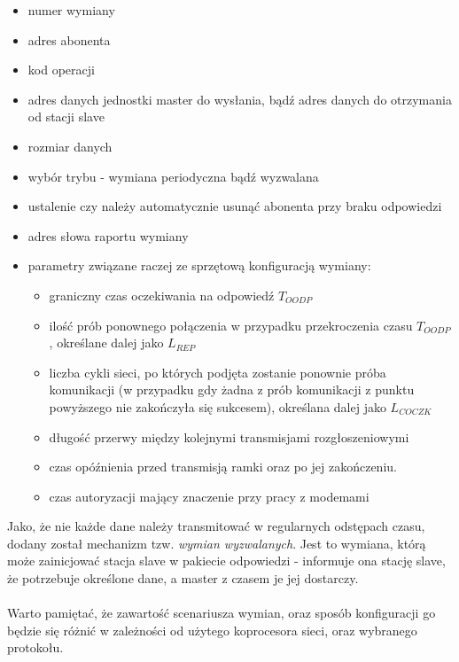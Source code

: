 	\begin{itemize}
		\item numer wymiany
		\item adres abonenta
		\item kod operacji
		\item adres danych jednostki master do wysłania, bądź adres danych do otrzymania od stacji slave
		\item rozmiar danych
		\item wybór trybu - wymiana periodyczna bądź wyzwalana
		\item ustalenie czy należy automatycznie usunąć abonenta przy braku odpowiedzi
		\item adres słowa raportu wymiany
		\item parametry związane raczej ze sprzętową konfiguracją wymiany:
		\begin{itemize}
			\item graniczny czas oczekiwania na odpowiedź $ T_{OODP} $
			\item ilość prób ponownego połączenia w przypadku przekroczenia czasu $ T_{OODP} $, określane dalej jako $ L_{REP} $
			\item liczba cykli sieci, po których podjęta zostanie ponownie próba komunikacji (w przypadku gdy żadna z prób komunikacji z punktu powyższego nie zakończyła się sukcesem), określana dalej jako $ L_{COCZK} $
			\item długość przerwy między kolejnymi transmisjami rozgłoszeniowymi
			\item czas opóźnienia przed transmisją ramki oraz po jej zakończeniu.
			\item czas autoryzacji mający znaczenie przy pracy z modemami
		\end{itemize}
	\end{itemize}
	Jako, że nie każde dane należy transmitować w regularnych odstępach czasu, dodany został mechanizm tzw. \textit{wymian wyzwalanych}. Jest to wymiana, którą może zainicjować stacja slave w pakiecie odpowiedzi - informuje ona stację slave, że potrzebuje określone dane, a master z czasem je jej dostarczy.\\
	\\
	Warto pamiętać, że zawartość scenariusza wymian, oraz sposób konfiguracji go będzie się różnić w zależności od użytego koprocesora sieci, oraz wybranego protokołu.